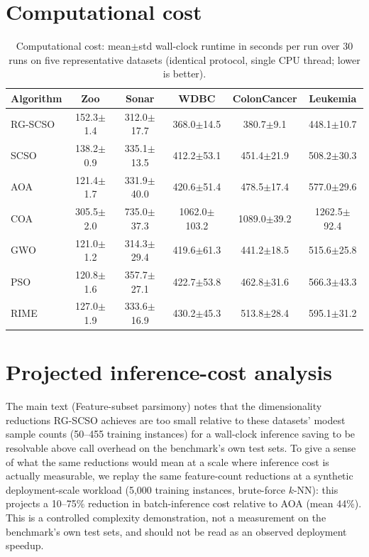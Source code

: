 \documentclass[9pt]{article}
\begin{document}
\FloatBarrier
\section{Computational cost}
\begin{table}[t]
\centering
\caption{Computational cost: mean$\pm$std wall-clock runtime in seconds per run over 30 runs on five representative datasets (identical protocol, single CPU thread; lower is better).}
\label{tab:runtime}
\footnotesize
\setlength{\tabcolsep}{4pt}
\begin{tabular}{lccccc}
\toprule
Algorithm & Zoo & Sonar & WDBC & ColonCancer & Leukemia \\
\midrule
RG-SCSO & 152.3$\pm$1.4 & 312.0$\pm$17.7 & 368.0$\pm$14.5 & 380.7$\pm$9.1 & 448.1$\pm$10.7 \\
SCSO & 138.2$\pm$0.9 & 335.1$\pm$13.5 & 412.2$\pm$53.1 & 451.4$\pm$21.9 & 508.2$\pm$30.3 \\
AOA & 121.4$\pm$1.7 & 331.9$\pm$40.0 & 420.6$\pm$51.4 & 478.5$\pm$17.4 & 577.0$\pm$29.6 \\
COA & 305.5$\pm$2.0 & 735.0$\pm$37.3 & 1062.0$\pm$103.2 & 1089.0$\pm$39.2 & 1262.5$\pm$92.4 \\
GWO & 121.0$\pm$1.2 & 314.3$\pm$29.4 & 419.6$\pm$61.3 & 441.2$\pm$18.5 & 515.6$\pm$25.8 \\
PSO & 120.8$\pm$1.6 & 357.7$\pm$27.1 & 422.7$\pm$53.8 & 462.8$\pm$31.6 & 566.3$\pm$43.3 \\
RIME & 127.0$\pm$1.9 & 333.6$\pm$16.9 & 430.2$\pm$45.3 & 513.8$\pm$28.4 & 595.1$\pm$31.2 \\
\bottomrule
\end{tabular}
\end{table}


\FloatBarrier
\section{{Projected inference-cost analysis}}
The main text (Feature-subset parsimony) notes that the dimensionality reductions RG-SCSO achieves are too small relative to these datasets' modest sample counts (50--455 training instances) for a wall-clock inference saving to be resolvable above call overhead on the benchmark's own test sets. To give a sense of what the same reductions would mean at a scale where inference cost is actually measurable, we replay the same feature-count reductions at a synthetic deployment-scale workload (5{,}000 training instances, brute-force $k$-NN): this projects a 10--75\% reduction in batch-inference cost relative to AOA (mean 44\%). This is a controlled complexity demonstration, not a measurement on the benchmark's own test sets, and should not be read as an observed deployment speedup.
\end{document}
